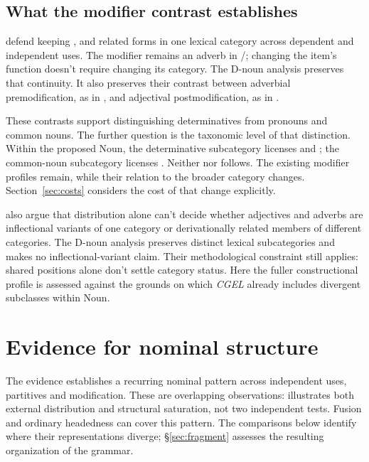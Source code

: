 \documentclass[12pt]{article}
\begin{document}
\subsection{What the modifier contrast establishes}\label{sec:payne}

\textcite[40--42]{payne2010} defend keeping ,  and related forms in one lexical category across dependent and independent uses. The modifier remains an adverb in /; changing the item's function doesn't require changing its category. The D-noun analysis preserves that continuity. It also preserves their contrast between adverbial premodification, as in , and adjectival postmodification, as in .

These contrasts support distinguishing determinatives from pronouns and common nouns. The further question is the taxonomic level of that distinction. Within the proposed Noun, the determinative subcategory licenses  and ; the common-noun subcategory licenses . Neither  nor  follows. The existing modifier profiles remain, while their relation to the broader category changes. Section~\ref{sec:costs} considers the cost of that change explicitly.

\textcite[60--61]{payne2010} also argue that distribution alone can't decide whether adjectives and adverbs are inflectional variants of one category or derivationally related members of different categories. The D-noun analysis preserves distinct lexical subcategories and makes no inflectional-variant claim. Their methodological constraint still applies: shared positions alone don't settle category status. Here the fuller constructional profile is assessed against the grounds on which \textit{CGEL} already includes divergent subclasses within Noun.

\section{Evidence for nominal structure}\label{sec:evidence}

The evidence establishes a recurring nominal pattern across independent uses, partitives and modification. These are overlapping observations:  illustrates both external distribution and structural saturation, not two independent tests. Fusion and ordinary headedness can cover this pattern. The comparisons below identify where their representations diverge; §\ref{sec:fragment} assesses the resulting organization of the grammar.
\end{document}
